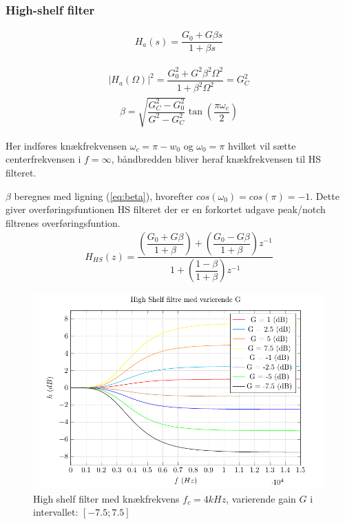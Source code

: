    
     \subsubsection{High-shelf filter}

     \begin{align}
        H_a (s) = \dfrac{G_0 + G \beta s}{1 + \beta s}
     \end{align}

     \begin{align}
         |H_a(\Omega)|^2 = \dfrac{G_0^2 + G^2 \beta^2 \Omega^2}{1 + \beta^2 \Omega^2} = G_C^2
     \end{align}
    \begin{align}
        \beta = \sqrt{\dfrac{G_C^2 - G_0^2}{G^2 - G_C^2}} \tan \left( \dfrac{\pi \omega_c}{2} \right)
    \end{align}


     Her indføres knækfrekvensen $\omega_c = \pi - w_0$ og $\omega_0 = \pi$ hvilket vil sætte centerfrekvensen i $f = \infty$, båndbredden bliver heraf knækfrekvensen 
     til HS filteret.

     $\beta$ beregnes med ligning (\ref{eq:beta}), hvorefter $cos(\omega_0) = cos(\pi) = -1$. Dette giver overføringsfuntionen HS filteret 
     der er en forkortet udgave peak/notch filtrenes overføringsfuntion.
     \begin{align}
     H_{HS}(z) =     \dfrac{\left(\dfrac{G_0 + G \beta}{1 + \beta} \right) + \left(\dfrac{ G_0 - G \beta}{1 + \beta }\right) z^{-1}}{1  + \left( \dfrac{1 - \beta}{1 + \beta} \right) z^{-1}}
     \end{align}


  \begin{figure}[h]
      \centering
        \includegraphics[]{figure/iir_hs.pdf}
        \caption{High shelf filter med knækfrekvens $f_c = 4kHz$, varierende gain $G$ i intervallet: $[-7.5 ; 7.5]$}
   \end{figure}  


